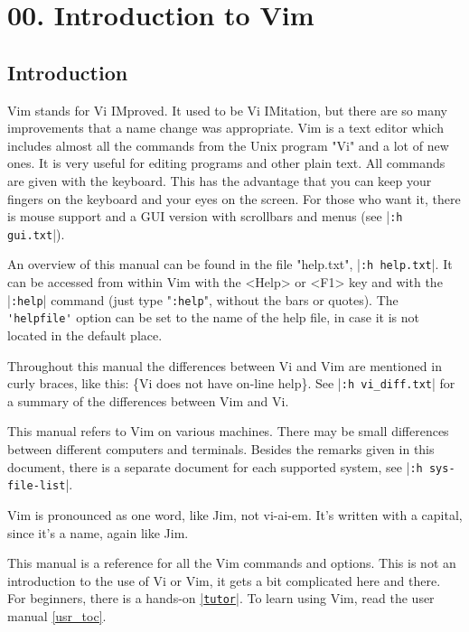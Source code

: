 \section{00. Introduction to Vim}
\label{ref}
\label{reference}
\subsection{Introduction}
\label{intro}
Vim stands for Vi IMproved.
It used to be Vi IMitation, but there are so many improvements that a name change was appropriate.
Vim is a text editor which includes almost all the commands from the Unix program "Vi" and a lot of new ones.
It is very useful for editing programs and other plain text.
All commands are given with the keyboard.
This has the advantage that you can keep your fingers on the keyboard and your eyes on the screen.
For those who want it, there is mouse support and a GUI version with scrollbars and menus (see |\verb!:h gui.txt!|).

An overview of this manual can be found in the file "help.txt", |\verb!:h help.txt!|.
It can be accessed from within Vim with the <Help> or <F1> key and with the |\verb!:help!| command (just type "\verb!:help!", without the bars or quotes).
The \verb!'helpfile'! option can be set to the name of the help file, in case it is not located in the default place.

Throughout this manual the differences between Vi and Vim are mentioned in curly braces, like this: \{Vi does not have on-line help\}.
See |\verb!:h vi_diff.txt!| for a summary of the differences between Vim and Vi.

This manual refers to Vim on various machines.
There may be small differences between different computers and terminals.
Besides the remarks given in this document, there is a separate document for each supported system, see |\verb!:h sys-file-list!|.

\label{pronounce}
Vim is pronounced as one word, like Jim, not vi-ai-em.
It's written with a capital, since it's a name, again like Jim.

This manual is a reference for all the Vim commands and options.
This is not an introduction to the use of Vi or Vim, it gets a bit complicated here and there.
For beginners, there is a hands-on \hyperref[tutor]{|\texttt{tutor}|}.
To learn using Vim, read the user manual \ref{usr_toc}.


